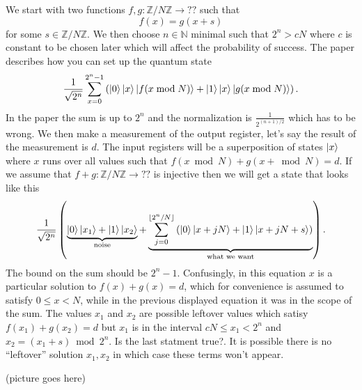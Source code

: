 \documentclass[10pt]{article}
\theoremstyle{plain}
\theoremstyle{definition}
\newcommand{\N}{\mathbb{N}}
\newcommand{\Z}{\mathbb{Z}}
\begin{document}
We start with two functions \( f, g: \Z / N\Z \to ?? \) such that
\[
    f(x) = g(x+s)
\]
for some \( s \in \Z / N\Z \).
We then choose \( n \in \N \) minimal such that \( 2^n > cN \) where \( c \) is constant to be chosen later which will affect the probability of success. The paper describes how you can set up the quantum state
\[
    \frac{1}{\sqrt{2^{n}}} \sum_{x=0}^{2^n-1} \left( \ket{0}\ket{x}\ket{f(x \bmod{N})} + \ket{1}\ket{x}\ket{g(x \bmod{N})} \right).
\]
{
\color{red} In the paper the sum is up to \( 2^n \) and the normalization is \( \frac{1}{2^{(n+1) / 2}} \) which has to be wrong.
}
We then make a measurement of the output register, let's say the result of the measurement is \( d \). The input registers will be a superposition of states \( \ket{x} \) where \( x \) runs over all values such that \( f(x \bmod{N}) + g(x + \bmod{N}) = d\). If we assume that \( f+g : \Z / N\Z \to ?? \) is injective then we will get a state that looks like this
\[
    \frac{1}{\sqrt{2^n}}
    \left(
    \underbrace{\ket{0}\ket{x_1} + \ket{1}\ket{x_2}}_{\text{noise}} +
    \underbrace{\sum_{j=0}^{\lfloor 2^n / N \rfloor }
        \left(
        \ket{0}\ket{x + jN}+ \ket{1}\ket{x + jN + s} \right)}_{\text{what we want}}
    \right).
\]
{
\color{red} The bound on the sum should be \( 2^n - 1 \).
}
Confusingly, in this equation \( x \) is a particular solution to \( f(x) + g(x) = d \), which for convenience is assumed to satisfy \( 0 \leq x < N \), while in the previous displayed equation it was in the scope of the sum.
The values \( x_1 \) and \( x_2 \) are possible leftover values which satisy \( f(x_1) + g(x_2) = d \) but \( x_1 \) is in the interval \( cN \leq x_1 < 2^n  \) and \( x_2 = (x_1 + s) \bmod{2^n} \).
{
\color{red} Is the last statment true?.
}
It is possible there is no ``leftover'' solution \( x_1, x_2 \) in which case these terms won't appear.

\begin{center}
    (picture goes here)
\end{center}
\end{document}
